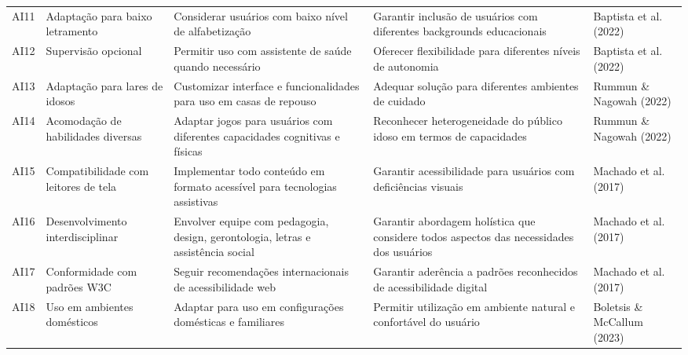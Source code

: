 \begin{table}[H]
\begin{table}[H]
\begin{tabular}{p{0.5cm}p{3cm}p{4cm}p{4cm}p{2.5cm}}
AI11 & Adaptação para baixo letramento & Considerar usuários com baixo nível de alfabetização & Garantir inclusão de usuários com diferentes backgrounds educacionais & Baptista et al. (2022) \\
AI12 & Supervisão opcional & Permitir uso com assistente de saúde quando necessário & Oferecer flexibilidade para diferentes níveis de autonomia & Baptista et al. (2022) \\
AI13 & Adaptação para lares de idosos & Customizar interface e funcionalidades para uso em casas de repouso & Adequar solução para diferentes ambientes de cuidado & Rummun \& Nagowah (2022) \\
AI14 & Acomodação de habilidades diversas & Adaptar jogos para usuários com diferentes capacidades cognitivas e físicas & Reconhecer heterogeneidade do público idoso em termos de capacidades & Rummun \& Nagowah (2022) \\
AI15 & Compatibilidade com leitores de tela & Implementar todo conteúdo em formato acessível para tecnologias assistivas & Garantir acessibilidade para usuários com deficiências visuais & Machado et al. (2017) \\
AI16 & Desenvolvimento interdisciplinar & Envolver equipe com pedagogia, design, gerontologia, letras e assistência social & Garantir abordagem holística que considere todos aspectos das necessidades dos usuários & Machado et al. (2017) \\
AI17 & Conformidade com padrões W3C & Seguir recomendações internacionais de acessibilidade web & Garantir aderência a padrões reconhecidos de acessibilidade digital & Machado et al. (2017) \\
AI18 & Uso em ambientes domésticos & Adaptar para uso em configurações domésticas e familiares & Permitir utilização em ambiente natural e confortável do usuário & Boletsis \& McCallum (2023) \\
\hline
\end{tabular}
\end{table}



\end{table}
